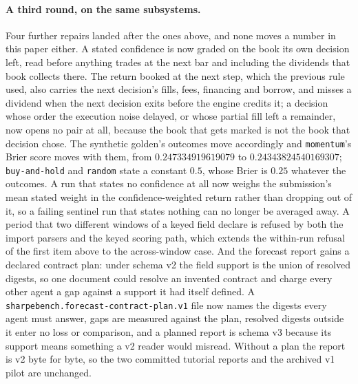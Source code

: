 \paragraph{A third round, on the same subsystems.} Four further repairs landed after the ones above, and none moves a number in this paper either. A stated confidence is now graded on the book its own decision left, read before anything trades at the next bar and including the dividends that book collects there. The return booked at the next step, which the previous rule used, also carries the next decision's fills, fees, financing and borrow, and misses a dividend when the next decision exits before the engine credits it; a decision whose order the execution noise delayed, or whose partial fill left a remainder, now opens no pair at all, because the book that gets marked is not the book that decision chose. The synthetic golden's outcomes move accordingly and \texttt{momentum}'s Brier score moves with them, from $0.247334919619079$ to $0.24343824540169307$; \texttt{buy-and-hold} and \texttt{random} state a constant $0.5$, whose Brier is $0.25$ whatever the outcomes. A run that states no confidence at all now weighs the submission's mean stated weight in the confidence-weighted return rather than dropping out of it, so a failing sentinel run that states nothing can no longer be averaged away. A period that two different windows of a keyed field declare is refused by both the import parsers and the keyed scoring path, which extends the within-run refusal of the first item above to the across-window case. And the forecast report gains a declared contract plan: under schema v2 the field support is the union of resolved digests, so one document could resolve an invented contract and charge every other agent a gap against a support it had itself defined. A \texttt{sharpebench.forecast-contract-plan.v1} file now names the digests every agent must answer, gaps are measured against the plan, resolved digests outside it enter no loss or comparison, and a planned report is schema v3 because its support means something a v2 reader would misread. Without a plan the report is v2 byte for byte, so the two committed tutorial reports and the archived v1 pilot are unchanged.

